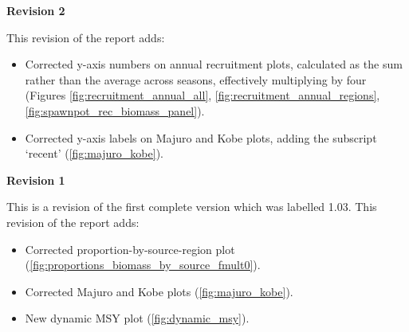 \documentclass{SCreport}
\begin{document}
\wcpfctitlepage

\clearpage
\newpage

\newpage
\clearpage

\textbf{Revision 2}

This revision of the report adds:

\begin{itemize}
  \item Corrected y-axis numbers on annual recruitment plots, calculated as the sum rather than the average across seasons, effectively multiplying by four (Figures \ref{fig:recruitment_annual_all}, \ref{fig:recruitment_annual_regions}, \ref{fig:spawnpot_rec_biomass_panel}).\\[-4ex]
  \item Corrected y-axis labels on Majuro and Kobe plots, adding the subscript `recent' (\autoref{fig:majuro_kobe}).
\end{itemize}

\vspace{2ex}

\textbf{Revision 1}

This is a revision of the first complete version which was labelled 1.03. This revision of the report adds:

\begin{itemize}
  \item Corrected proportion-by-source-region plot (\autoref{fig:proportions_biomass_by_source_fmult0}).\\[-4ex]
  \item Corrected Majuro and Kobe plots (\autoref{fig:majuro_kobe}).\\[-4ex]
  \item New dynamic MSY plot (\autoref{fig:dynamic_msy}).
\end{itemize}

\newpage
\newpage

\tableofcontents

\newpage
\clearpage
\newpage













\newpage
\clearpage
\newpage




\clearpage
\newpage
\end{document}
